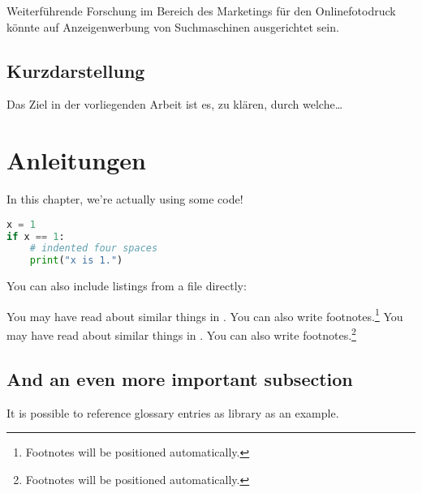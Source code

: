 Weiterführende Forschung im Bereich des Marketings für den Onlinefotodruck könnte auf Anzeigenwerbung von Suchmaschinen ausgerichtet sein.

\subsection{Kurzdarstellung}
Das Ziel in der vorliegenden Arbeit ist es, zu klären, durch welche\dots


\section{Anleitungen}
In this chapter, we're actually using some code!

\begin{lstlisting}[language=Python,caption={This is an example of inline listing},captionpos=b]
x = 1
if x == 1:
    # indented four spaces
    print("x is 1.")

\end{lstlisting}

You can also include listings from a file directly:



You may have read about similar things in \cite{Goodliffe2007}.
You can also write footnotes.\footnote{Footnotes will be positioned automatically.}
You may have read about similar things in \cite{Goodliffe2007}.
You can also write footnotes.\footnote{Footnotes will be positioned automatically.}




\subsection{And an even more important subsection}

It is possible to reference glossary entries as \gls{library} as an example.
